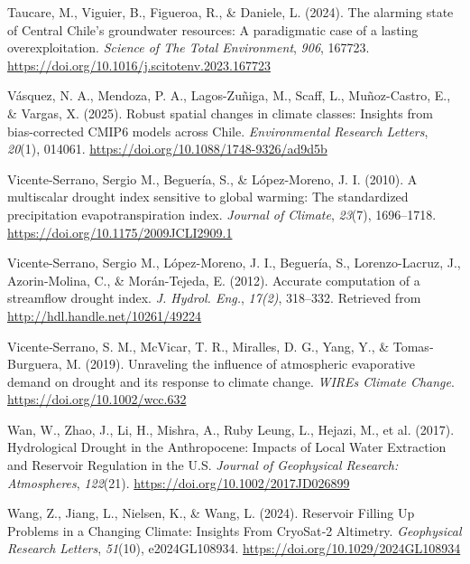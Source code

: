 \documentclass[
]{agujournal2019}
\newlength{\cslhangindent}
\newenvironment{CSLReferences}[2] %
 {\begin{list}{}{%
  \setlength{\itemindent}{0pt}
  \setlength{\leftmargin}{0pt}
  \setlength{\parsep}{0pt}
  \ifodd #1
   \setlength{\leftmargin}{\cslhangindent}
   \setlength{\itemindent}{-1\cslhangindent}
  \fi
  \setlength{\itemsep}{#2\baselineskip}}}
 {\end{list}}
\begin{document}
\begin{CSLReferences}{1}{0}
Taucare, M., Viguier, B., Figueroa, R., \& Daniele, L. (2024). The
alarming state of {Central} {Chile}'s groundwater resources: {A}
paradigmatic case of a lasting overexploitation. \emph{Science of The
Total Environment}, \emph{906}, 167723.
\url{https://doi.org/10.1016/j.scitotenv.2023.167723}

Vásquez, N. A., Mendoza, P. A., Lagos-Zuñiga, M., Scaff, L.,
Muñoz-Castro, E., \& Vargas, X. (2025). Robust spatial changes in
climate classes: Insights from bias-corrected {CMIP6} models across
{Chile}. \emph{Environmental Research Letters}, \emph{20}(1), 014061.
\url{https://doi.org/10.1088/1748-9326/ad9d5b}

Vicente-Serrano, Sergio M., Beguería, S., \& López-Moreno, J. I. (2010).
A multiscalar drought index sensitive to global warming: {The}
standardized precipitation evapotranspiration index. \emph{Journal of
Climate}, \emph{23}(7), 1696--1718.
\url{https://doi.org/10.1175/2009JCLI2909.1}

Vicente-Serrano, Sergio M., López-Moreno, J. I., Beguería, S.,
Lorenzo-Lacruz, J., Azorin-Molina, C., \& Morán-Tejeda, E. (2012).
Accurate computation of a streamflow drought index. \emph{J. Hydrol.
Eng.}, \emph{17(2)}, 318--332. Retrieved from
\url{http://hdl.handle.net/10261/49224}

Vicente‐Serrano, S. M., McVicar, T. R., Miralles, D. G., Yang, Y., \&
Tomas‐Burguera, M. (2019). Unraveling the influence of atmospheric
evaporative demand on drought and its response to climate change.
\emph{WIREs Climate Change}. \url{https://doi.org/10.1002/wcc.632}

Wan, W., Zhao, J., Li, H., Mishra, A., Ruby Leung, L., Hejazi, M., et
al. (2017). Hydrological {Drought} in the {Anthropocene}: {Impacts} of
{Local} {Water} {Extraction} and {Reservoir} {Regulation} in the
{U}.{S}. \emph{Journal of Geophysical Research: Atmospheres},
\emph{122}(21). \url{https://doi.org/10.1002/2017JD026899}

Wang, Z., Jiang, L., Nielsen, K., \& Wang, L. (2024). Reservoir
{Filling} {Up} {Problems} in a {Changing} {Climate}: {Insights} {From}
{CryoSat}‐2 {Altimetry}. \emph{Geophysical Research Letters},
\emph{51}(10), e2024GL108934. \url{https://doi.org/10.1029/2024GL108934}


\end{CSLReferences}
\end{document}
